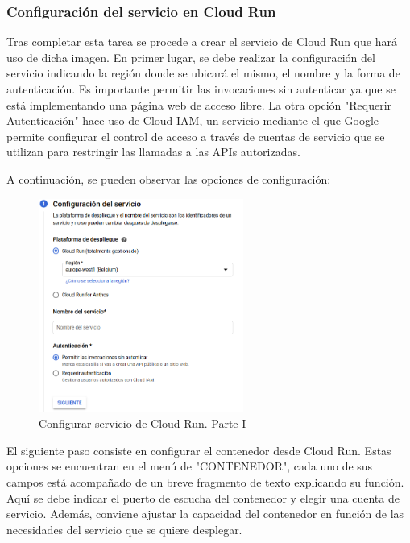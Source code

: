 \subsubsection{Configuración del servicio en Cloud Run}

Tras completar esta tarea se procede a crear el servicio de Cloud Run que hará uso de dicha imagen. En primer lugar, se debe realizar la configuración del servicio indicando la región donde se ubicará el mismo, el nombre y la forma de autenticación. Es importante permitir las invocaciones sin autenticar ya que se está implementando una página web de acceso libre. La otra opción "Requerir Autenticación" hace uso de Cloud IAM, un servicio mediante el que Google permite configurar el control de acceso a través de cuentas de servicio que se utilizan para restringir las llamadas a las APIs autorizadas. 

A continuación, se pueden observar las opciones de configuración:

\begin{figure}[ht]
    	\begin{center}
    		\includegraphics[width = 0.60\textwidth]{Figuras/WordpressCloudRun1.PNG}
    	\end{center}
    	\caption{\label{fig:CloudRun1} Configurar servicio de Cloud Run. Parte I}
\end{figure}

El siguiente paso consiste en configurar el contenedor desde Cloud Run. Estas opciones se encuentran en el menú de "CONTENEDOR", cada uno de sus campos está acompañado de un breve fragmento de texto explicando su función. Aquí se debe indicar el puerto de escucha del contenedor y elegir una cuenta de servicio. Además, conviene ajustar la capacidad del contenedor en función de las necesidades del servicio que se quiere desplegar.

